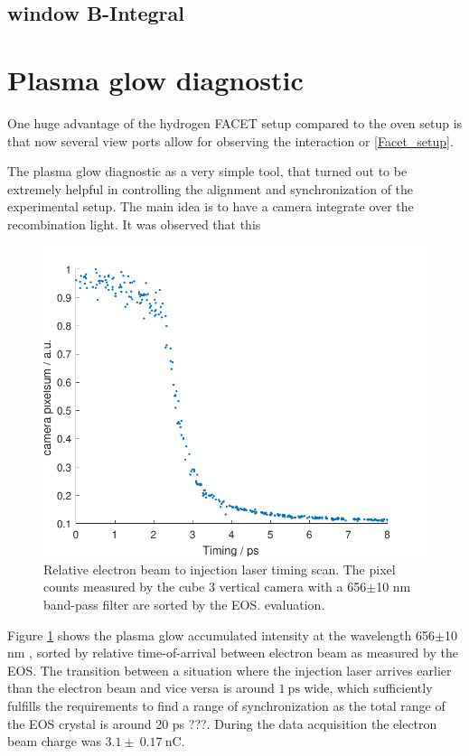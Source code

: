 \subsection{window B-Integral}

\section{Plasma glow diagnostic}
\label{sec:Plasma_Glow}
One huge advantage of the hydrogen FACET setup compared to the oven setup is that now several view ports allow for observing the interaction or \ref{Facet_setup}.

The plasma glow diagnostic as a very simple tool, that turned out to be extremely helpful in controlling the 
alignment and synchronization of the experimental setup. The main idea is to have a camera integrate over the recombination light. It was observed that this 

\begin{figure}[htbp]
\includegraphics[width=1\textwidth]{experiment/images/raw/PlasmaGlow_20384_scatter.pdf}
\caption{Relative electron beam to injection laser timing scan. The pixel counts measured by the cube 3 vertical camera with a 656$\pm$10 nm  band-pass filter are sorted by the EOS. evaluation.}
\label{img:PlasmaGlowTimingOAP_H2He}
\end{figure}

Figure \ref{img:PlasmaGlowTimingOAP_H2He} shows the plasma glow accumulated intensity at the wavelength 656$\pm$10 nm , sorted by relative time-of-arrival between electron beam as measured by the EOS. The transition between a situation where the injection laser arrives earlier than the electron beam and vice versa is around $1\ \mathrm{ps}$ wide, which sufficiently fulfills the requirements to find a range of synchronization as the total range of the EOS crystal is around 20 ps ???.
During the data acquisition the electron beam charge was $3.1\pm \ 0.17\ \mathrm{nC}$. 

